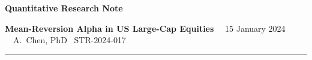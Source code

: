 \documentclass[10pt]{article}
\begin{document}
{\huge\bfseries\color{navy}Quantitative Research Note}

\vspace{4pt}
{\large\color{gold}\bfseries Mean-Reversion Alpha in US Large-Cap Equities}
\hfill
{\footnotesize\color{midgray}\faCalendar\ \ 15 January 2024\quad
 \faUser\ \ A.\ Chen, PhD\quad
 \faHashtag\ STR-2024-017}

\vspace{6pt}
{\color{lightrule}\rule{\linewidth}{1.2pt}}
\vspace{8pt}

\end{document}
